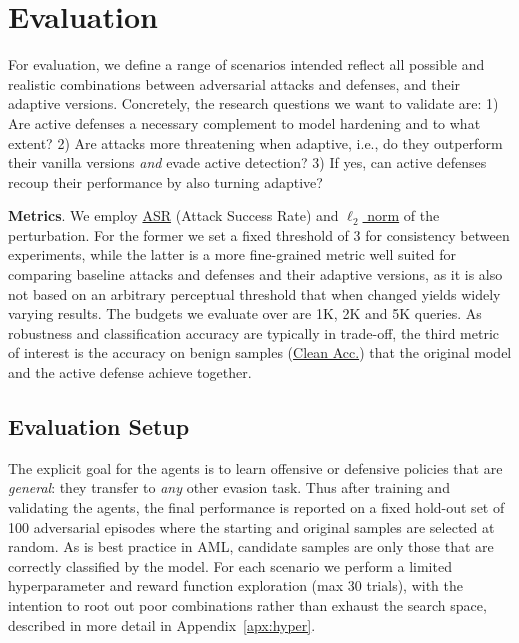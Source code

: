 \section{Evaluation}
\label{sec:evaluation}
For evaluation, we define a range of scenarios intended reflect all possible and realistic combinations between adversarial attacks and defenses, and their adaptive versions.
Concretely, the research questions we want to validate are: 1) Are active defenses a necessary complement to model hardening and to what extent? 2) Are attacks more threatening when adaptive, i.e., do they outperform their vanilla versions \textit{and} evade active detection? 3) If yes, can active defenses recoup their performance by also turning adaptive?

\textbf{Metrics}. We employ \underline{ASR} (Attack Success Rate) and \underline{$\ell_2$ norm} of the perturbation.
For the former we set a fixed threshold of 3 for consistency between experiments, while the latter is a more fine-grained metric well suited for comparing baseline attacks and defenses and their adaptive versions, as it is also not based on an arbitrary perceptual threshold that when changed yields widely varying results.
The budgets we evaluate over are 1K, 2K and 5K queries.
As robustness and classification accuracy are typically in trade-off, the third metric of interest is the accuracy on benign samples (\underline{Clean Acc.}) that the original model and the active defense achieve together.

\subsection{Evaluation Setup}
The explicit goal for the agents is to learn offensive or defensive policies that are \emph{general}: they transfer to \textit{any} other evasion task.
Thus after training and validating the agents, the final performance is reported on a fixed hold-out set of 100 adversarial episodes where the starting and original samples are selected at random.
As is best practice in \gls{AML}, candidate samples are only those that are correctly classified by the model.
For each scenario we perform a limited hyperparameter and reward function exploration (max 30 trials), with the intention to root out poor combinations rather than exhaust the search space, described in more detail in Appendix~\ref{apx:hyper}.

